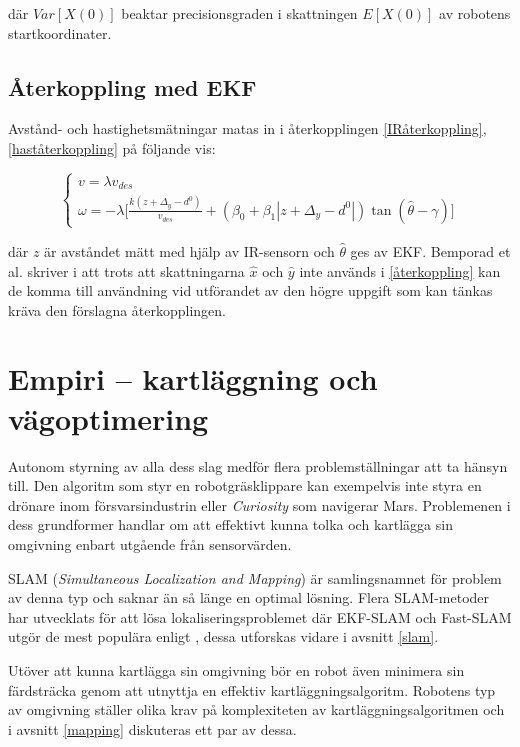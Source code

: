 \documentclass[11pt]{article}
\begin{document}
\begin{flushleft}
där $Var[X(0)]$ beaktar precisionsgraden i skattningen $E[X(0)]$ av robotens startkoordinater.

\subsection{Återkoppling med EKF}
Avstånd- och hastighetsmätningar matas in i återkopplingen \eqref{IRåterkoppling},  \eqref{haståterkoppling} på följande vis:

\begin{equation}\label{återkoppling}
	\begin{cases}
	v = \lambda v_{des} \\
	\omega = - \lambda \bigg[ \frac {k(z + \Delta_y - d^0)} {v_{des}} + (\beta_0 + \beta_1 | z + \Delta_y - d^0 |) \tan (\hat{\theta} - \gamma) \bigg]
	\end{cases}
\end{equation}

där $z$ är avståndet mätt med hjälp av IR-sensorn och $\hat{\theta}$ ges av EKF. Bemporad et al. skriver i \cite{wfp} att trots att skattningarna $\hat{x}$ och $\hat{y}$ inte används i \eqref{återkoppling} kan de komma till användning vid utförandet av den högre uppgift som kan tänkas kräva den förslagna återkopplingen.

\pagebreak
\section{Empiri -- kartläggning och vägoptimering}
Autonom styrning av alla dess slag medför flera problemställningar att ta hänsyn till. Den algoritm som styr en robotgräsklippare kan exempelvis inte styra en drönare inom försvarsindustrin eller \emph{Curiosity} som navigerar Mars. Problemenen i dess grundformer handlar om att effektivt kunna tolka och kartlägga sin omgivning enbart utgående från sensorvärden.

SLAM (\emph{Simultaneous Localization and Mapping}) är samlingsnamnet för problem av denna typ och saknar än så länge en optimal lösning. Flera SLAM-metoder har utvecklats för att lösa lokaliseringsproblemet där EKF-SLAM och Fast-SLAM utgör de mest populära enligt \cite{rat}, dessa utforskas vidare i avsnitt \ref{slam}.

Utöver att kunna kartlägga sin omgivning bör en robot även minimera sin färdsträcka genom att utnyttja en effektiv kartläggningsalgoritm. Robotens typ av omgivning ställer olika krav på komplexiteten av kartläggningsalgoritmen och i avsnitt \ref{mapping} diskuteras ett par av dessa.


\end{flushleft}
\end{document}
